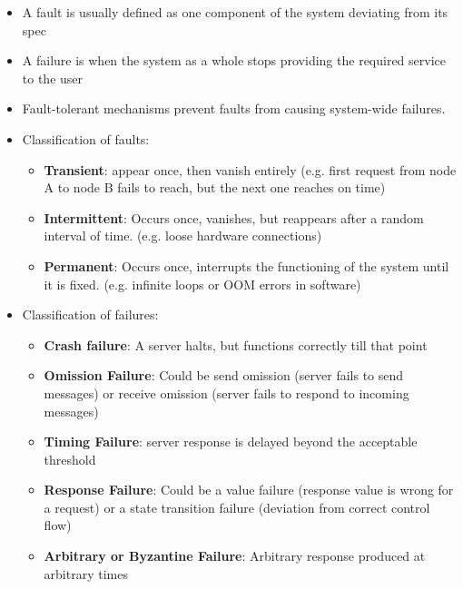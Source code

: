 \documentclass{article}
\begin{document}
\begin{itemize}
    \item A fault is usually defined as one component of the system deviating from its spec
    
    \item A failure is when the system as a whole stops providing the required service to the user
    
    \item Fault-tolerant mechanisms prevent faults from causing system-wide failures. 
    
    \item Classification of faults:
    \begin{itemize}
        \item \textbf{Transient}: appear once, then vanish entirely (e.g. first request from node A to node B fails to reach, but the next one reaches on time)
        
        \item \textbf{Intermittent}: Occurs once, vanishes, but reappears after a random interval of time. (e.g. loose hardware connections)
        
        \item \textbf{Permanent}: Occurs once, interrupts the functioning of the system until it is fixed. (e.g. infinite loops or OOM errors in software)
    \end{itemize}
    
    \item Classification of failures:
    \begin{itemize}
        \item \textbf{Crash failure}: A server halts, but functions correctly till that point
        
        \item \textbf{Omission Failure}: Could be send omission (server fails to send messages) or receive omission (server fails to respond to incoming messages)
        
        \item \textbf{Timing Failure}: server response is delayed beyond the acceptable threshold
        
        \item \textbf{Response Failure}: Could be a value failure (response value is wrong for a request) or a state transition failure (deviation from correct control flow)
        
        \item \textbf{Arbitrary or Byzantine Failure}: Arbitrary response produced at arbitrary times
    \end{itemize}
\end{itemize}
\end{document}
